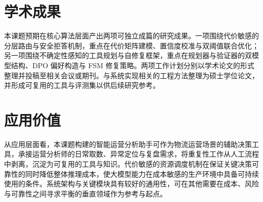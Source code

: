 \section{学术成果}

本课题预期在核心算法层面产出两项可独立成篇的研究成果。一项围绕代价敏感的分层路由与安全拒答机制，重点在代价矩阵建模、置信度校准与双阈值联合优化；另一项围绕不确定性感知的工具规划与自修复框架，重点在规划器与验证器的双模型结构、DPO 偏好构造与 FSM 修复策略。两项工作计划分别以学术论文的形式整理并投稿至相关会议或期刊。与系统实现相关的工程方法整理为硕士学位论文，并形成可复用的工具与评测集以供后续研究参考。

\section{应用价值}

从应用层面看，本课题构建的智能运营分析助手可作为物流运营场景的辅助决策工具，承接运营分析师的日常取数、异常定位与复盘需求，将重复性工作从人工流程中剥离，沉淀为可复用的工具与知识。代价敏感的资源调度机制在保证关键决策可靠性的同时降低整体推理成本，使大模型能力在成本敏感的生产环境中具备可持续使用的条件。系统架构与关键模块具有较好的通用性，可在其他需要在成本、风险与可靠性之间寻求平衡的垂直领域作为参考与起点。
